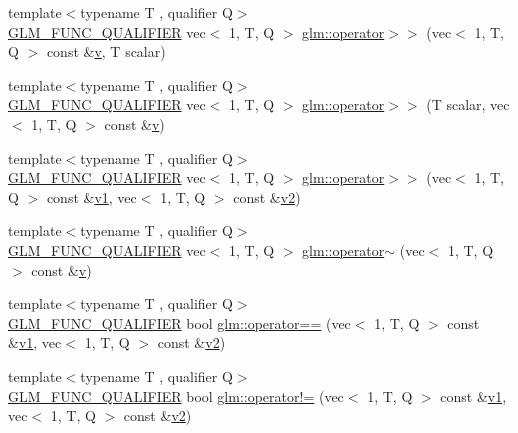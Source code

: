 \begin{DoxyCompactItemize}
\item 
{\footnotesize template$<$typename T , qualifier Q$>$ }\\\hyperlink{setup_8hpp_a33fdea6f91c5f834105f7415e2a64407}{G\+L\+M\+\_\+\+F\+U\+N\+C\+\_\+\+Q\+U\+A\+L\+I\+F\+I\+ER} vec$<$ 1, T, Q $>$ \hyperlink{group__ext__vec1_ga4fbe19c5f5fba90c89934a540de87bc5}{glm\+::operator$>$$>$} (vec$<$ 1, T, Q $>$ const \&\hyperlink{_s_d_l__opengl_8h_a10a82eabcb59d2fcd74acee063775f90}{v}, T scalar)
\item 
{\footnotesize template$<$typename T , qualifier Q$>$ }\\\hyperlink{setup_8hpp_a33fdea6f91c5f834105f7415e2a64407}{G\+L\+M\+\_\+\+F\+U\+N\+C\+\_\+\+Q\+U\+A\+L\+I\+F\+I\+ER} vec$<$ 1, T, Q $>$ \hyperlink{group__ext__vec1_ga41efbda33c026dd25484c09e211eb68e}{glm\+::operator$>$$>$} (T scalar, vec$<$ 1, T, Q $>$ const \&\hyperlink{_s_d_l__opengl_8h_a10a82eabcb59d2fcd74acee063775f90}{v})
\item 
{\footnotesize template$<$typename T , qualifier Q$>$ }\\\hyperlink{setup_8hpp_a33fdea6f91c5f834105f7415e2a64407}{G\+L\+M\+\_\+\+F\+U\+N\+C\+\_\+\+Q\+U\+A\+L\+I\+F\+I\+ER} vec$<$ 1, T, Q $>$ \hyperlink{group__ext__vec1_gaf53e1d5cb9aa5de1b2a77bf40c275361}{glm\+::operator$>$$>$} (vec$<$ 1, T, Q $>$ const \&\hyperlink{_s_d_l__opengl__glext_8h_a435c176a02c061b43e19bdf7c86cceae}{v1}, vec$<$ 1, T, Q $>$ const \&\hyperlink{_s_d_l__opengl__glext_8h_a0928f6d0f0f794ba000a21dfae422136}{v2})
\item 
{\footnotesize template$<$typename T , qualifier Q$>$ }\\\hyperlink{setup_8hpp_a33fdea6f91c5f834105f7415e2a64407}{G\+L\+M\+\_\+\+F\+U\+N\+C\+\_\+\+Q\+U\+A\+L\+I\+F\+I\+ER} vec$<$ 1, T, Q $>$ \hyperlink{group__ext__vec1_ga923256ef3abbc940c475ddb5e2bca75b}{glm\+::operator$\sim$} (vec$<$ 1, T, Q $>$ const \&\hyperlink{_s_d_l__opengl_8h_a10a82eabcb59d2fcd74acee063775f90}{v})
\item 
{\footnotesize template$<$typename T , qualifier Q$>$ }\\\hyperlink{setup_8hpp_a33fdea6f91c5f834105f7415e2a64407}{G\+L\+M\+\_\+\+F\+U\+N\+C\+\_\+\+Q\+U\+A\+L\+I\+F\+I\+ER} bool \hyperlink{group__ext__vec1_gaa9cd0f18629236bade24765fd5d2616b}{glm\+::operator==} (vec$<$ 1, T, Q $>$ const \&\hyperlink{_s_d_l__opengl__glext_8h_a435c176a02c061b43e19bdf7c86cceae}{v1}, vec$<$ 1, T, Q $>$ const \&\hyperlink{_s_d_l__opengl__glext_8h_a0928f6d0f0f794ba000a21dfae422136}{v2})
\item 
{\footnotesize template$<$typename T , qualifier Q$>$ }\\\hyperlink{setup_8hpp_a33fdea6f91c5f834105f7415e2a64407}{G\+L\+M\+\_\+\+F\+U\+N\+C\+\_\+\+Q\+U\+A\+L\+I\+F\+I\+ER} bool \hyperlink{group__ext__vec1_gadc81ac3efb2cc1678cb7ebe126d2e26d}{glm\+::operator!=} (vec$<$ 1, T, Q $>$ const \&\hyperlink{_s_d_l__opengl__glext_8h_a435c176a02c061b43e19bdf7c86cceae}{v1}, vec$<$ 1, T, Q $>$ const \&\hyperlink{_s_d_l__opengl__glext_8h_a0928f6d0f0f794ba000a21dfae422136}{v2})

\end{DoxyCompactItemize}
